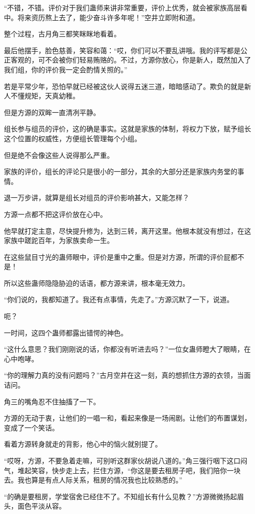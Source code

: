 \begin{this_body}
“不错，不错。评价对于我们蛊师来讲非常重要，评价上优秀，就会被家族高层看中。将来资历熬上去了，能少奋斗许多年呢！”空井立即附和道。

整个过程，古月角三都笑眯眯地看着。

最后他摆手，脸色慈善，笑容和蔼：“哎，你们可以不要乱讲哦。我的评写都是公正客观的，可不会被你们轻易贿赂的。不过，方源你放心，你是新人，既然加入了我们组，你的评价我一定会酌情关照的。”

若是平常少年，恐怕早就已经被这伙人说得五迷三道，暗暗感动了。欺负的就是新人不懂规矩，天真幼稚。

但是方源的双眸一直清冽平静。

组长参与组员的评价，这的确是事实。这就是家族的体制，将权力下放，赋予组长这个位置的权威性，方便组长管理每个小组。

但是绝不会像这些人说得那么严重。

家族的评价，组长的评论只是很小的一部分，其余的大部分还是家族内务堂的事情。

退一万步讲，就算是组长对组员的评价影响甚大，又能怎样？

方源一点都不把这评价放在心中。

他早就打定主意，尽快提升修为，达到三转，离开这里。他根本就没有想过，在这家族中蹉跎百年，为家族卖命一生。

在这些鼠目寸光的蛊师眼中，评价是重中之重。但是对方源，所谓的评价屁都不是！

所以这些蛊师隐隐胁迫的话语，都方源来讲，根本毫无效力。

“你们说的，我都知道了。我还有点事情，先走了。”方源沉默了一下，说道。

呃？

一时间，这四个蛊师都露出错愕的神色。

“这什么意思？我们刚刚说的话，你都没有听进去吗？”一位女蛊师瞪大了眼睛，在心中咆哮。

“你的理解力真的没有问题吗？”古月空井在这一刻，真的想抓住方源的衣领，当面诘问。

角三的嘴角忍不住抽搐了一下。

方源的无动于衷，让他们的一唱一和，看起来像是一场闹剧。让他们的布置谋划，变成了一个笑话。

看着方源转身就走的背影，他心中的恼火就别提了。

“哎呀，方源，不要急着走嘛，可别听这群家伙胡说八道的。”角三强行咽下这口闷气，堆起笑容，快步走上去，拦住方源，“你这是要去租房子吧，我们陪你一块去。我也算是有点人际关系，租房的情况我也比较熟悉的。”

“的确是要租房，学堂宿舍已经住不了。不知组长有什么见教？”方源微微扬起眉头，面色平淡从容。


\end{this_body}
